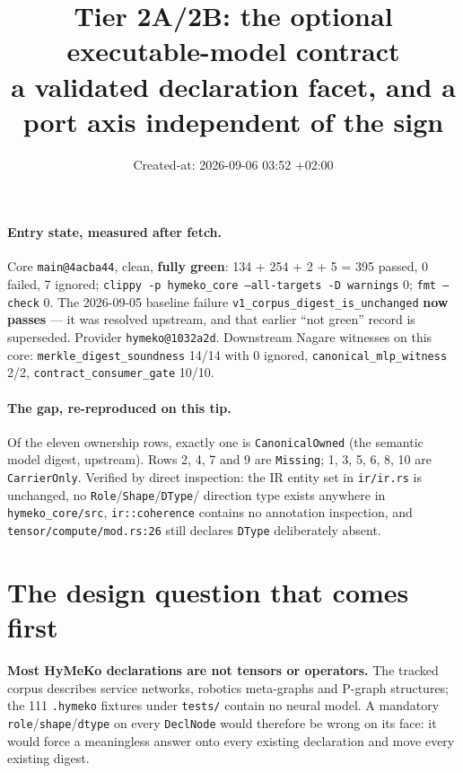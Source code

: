\documentclass[11pt,a4paper]{article}
\title{Tier 2A/2B: the optional executable-model contract\\
\large a validated declaration facet, and a port axis independent of the sign}
\date{Created-at: 2026-09-06 03:52 +02:00}
\begin{document}
\maketitle

\paragraph{Entry state, measured after fetch.}
Core \texttt{main@4acba44}, clean, \textbf{fully green}: 134 + 254 + 2 + 5 = 395 passed, 0 failed,
7 ignored; \texttt{clippy -p hymeko\_core --all-targets -D warnings} 0; \texttt{fmt --check} 0.
The 2026-09-05 baseline failure \texttt{v1\_corpus\_digest\_is\_unchanged} \textbf{now passes} --- it
was resolved upstream, and that earlier ``not green'' record is superseded. Provider
\texttt{hymeko@1032a2d}. Downstream Nagare witnesses on this core: \texttt{merkle\_digest\_soundness}
14/14 with 0 ignored, \texttt{canonical\_mlp\_witness} 2/2, \texttt{contract\_consumer\_gate} 10/10.

\paragraph{The gap, re-reproduced on this tip.} Of the eleven ownership rows, exactly one is
\texttt{CanonicalOwned} (the semantic model digest, upstream). Rows 2, 4, 7 and 9 are
\texttt{Missing}; 1, 3, 5, 6, 8, 10 are \texttt{CarrierOnly}. Verified by direct inspection: the IR
entity set in \texttt{ir/ir.rs} is unchanged, no \texttt{Role}/\texttt{Shape}/\texttt{DType}/
direction type exists anywhere in \texttt{hymeko\_core/src}, \texttt{ir::coherence} contains no
annotation inspection, and \texttt{tensor/compute/mod.rs:26} still declares \texttt{DType}
deliberately absent.

\section{The design question that comes first}

\textbf{Most HyMeKo declarations are not tensors or operators.} The tracked corpus describes service
networks, robotics meta-graphs and P-graph structures; the 111 \texttt{.hymeko} fixtures under
\texttt{tests/} contain no neural model. A mandatory \texttt{role}/\texttt{shape}/\texttt{dtype} on
every \texttt{DeclNode} would therefore be wrong on its face: it would force a meaningless answer
onto every existing declaration and move every existing digest.
\end{document}
